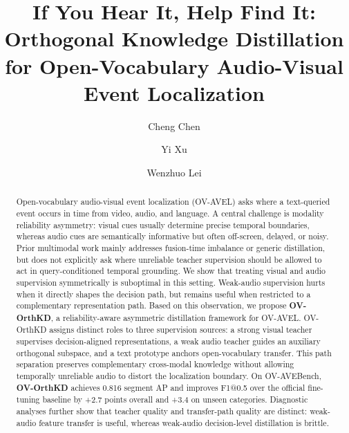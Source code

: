 \documentclass[sigconf,screen]{acmart}
\title{If You Hear It, Help Find It: Orthogonal Knowledge Distillation for Open-Vocabulary Audio-Visual Event Localization}
\author{Cheng Chen}
\affiliation{%
  \institution{Tongji University}%
  \city{Shanghai}%
  \country{China}%
}
\author{Yi Xu}
\affiliation{%
  \institution{Tongji University}%
  \city{Shanghai}%
  \country{China}%
}
\author{Wenzhuo Lei}
\affiliation{%
  \institution{Tongji University}%
  \city{Shanghai}%
  \country{China}%
}
\begin{document}
\begin{abstract}
Open-vocabulary audio-visual event localization (OV-AVEL) asks where a text-queried event occurs in time from video, audio, and language. A central challenge is modality reliability asymmetry: visual cues usually determine precise temporal boundaries, whereas audio cues are semantically informative but often off-screen, delayed, or noisy. Prior multimodal work mainly addresses fusion-time imbalance or generic distillation, but does not explicitly ask where unreliable teacher supervision should be allowed to act in query-conditioned temporal grounding. We show that treating visual and audio supervision symmetrically is suboptimal in this setting. Weak-audio supervision hurts when it directly shapes the decision path, but remains useful when restricted to a complementary representation path. Based on this observation, we propose \textbf{OV-OrthKD}, a reliability-aware asymmetric distillation framework for OV-AVEL. OV-OrthKD assigns distinct roles to three supervision sources: a strong visual teacher supervises decision-aligned representations, a weak audio teacher guides an auxiliary orthogonal subspace, and a text prototype anchors open-vocabulary transfer. This path separation preserves complementary cross-modal knowledge without allowing temporally unreliable audio to distort the localization boundary. On OV-AVEBench, \textbf{OV-OrthKD} achieves 0.816 segment AP and improves F1@0.5 over the official fine-tuning baseline by +2.7 points overall and +3.4 on unseen categories. Diagnostic analyses further show that teacher quality and transfer-path quality are distinct: weak-audio feature transfer is useful, whereas weak-audio decision-level distillation is brittle.
\end{abstract}

\maketitle
\end{document}
